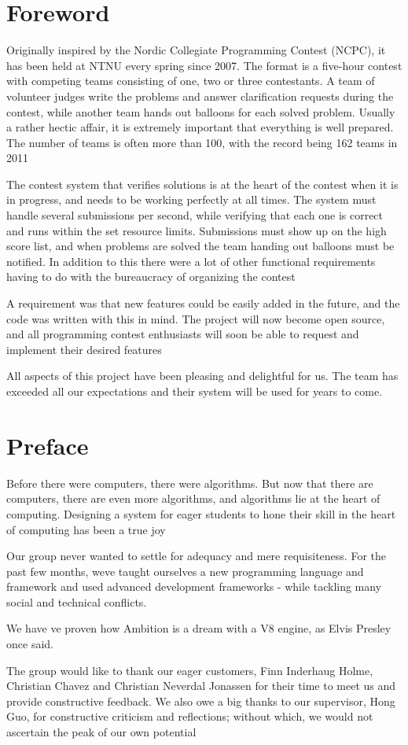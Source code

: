 \section*{Foreword}
Originally inspired by the Nordic Collegiate Programming Contest (NCPC),
it has been held at NTNU every spring since 2007. The format is a
five-hour contest with competing teams consisting of one, two or three
contestants. A team of volunteer judges write the problems and answer
clarification requests during the contest, while another team hands out
balloons for each solved problem. Usually a rather hectic affair, it is
extremely important that everything is well prepared. The number of
teams is often more than 100, with the record being 162 teams in 2011

The contest system that verifies solutions is at the heart of the
contest when it is in progress, and needs to be working perfectly at
all times. The system must handle several submissions per second, while
verifying that each one is correct and runs within the set resource
limits. Submissions must show up on the high score list, and when
problems are solved the team handing out balloons must be notified. In
addition to this there were a lot of other functional requirements
having to do with the bureaucracy of organizing the contest

A requirement was that new features could be easily added in the future,
and the code was written with this in mind. The project will now become
open source, and all programming contest enthusiasts will soon be able
to request and implement their desired features

All aspects of this project have been pleasing and delightful for us.
The team has exceeded all our expectations and their system will be
used for years to come.

\pagebreak

\section*{Preface}

Before there were computers, there were algorithms. But now that there are
computers, there are even more algorithms, and algorithms lie at the heart of
computing. Designing a system for eager students to hone their skill in the
heart of computing has been a true joy

Our group never wanted to settle for adequacy and mere requisiteness. For the
past few months, weve taught ourselves a new programming language and framework
and used advanced development frameworks - while tackling many social and
technical conflicts.

We have ve proven how Ambition is a dream with a V8 engine, as Elvis Presley
once said.

The group would like to thank our eager customers, Finn Inderhaug Holme,
Christian Chavez and Christian Neverdal Jonassen for their time to meet us and
provide constructive feedback. We also owe a big thanks to our supervisor, Hong
Guo, for constructive criticism and reflections; without which, we would not
ascertain the peak of our own potential
